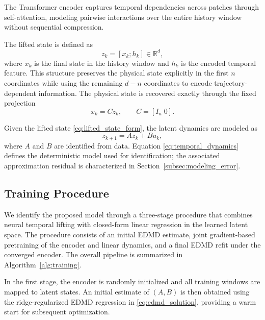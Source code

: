 \documentclass[journal]{IEEEtran}
\begin{document}
The Transformer encoder captures temporal dependencies across patches through self-attention, modeling pairwise interactions over the entire history window without sequential compression.

The lifted state is defined as
\begin{equation}
    z_k = [x_k;h_k] \in \mathbb{R}^{d},
    \label{eq:lifted_state_form}
\end{equation}
where $x_k$ is the final state in the history window and $h_k$ is the encoded temporal feature. This structure preserves the physical state explicitly in the first $n$ coordinates while using the remaining $d-n$ coordinates to encode trajectory-dependent information. The physical state is recovered exactly through the fixed projection
\begin{equation}
    x_k = C z_k, \qquad C = [I_n\;0].
    \label{eq:decoder_projection}
\end{equation}

Given the lifted state \eqref{eq:lifted_state_form}, the latent dynamics are modeled as
\begin{equation}
    z_{k+1} = A z_k + B u_k,
    \label{eq:temporal_dynamics}
\end{equation}
where $A$ and $B$ are identified from data. Equation \eqref{eq:temporal_dynamics} defines the deterministic model used for identification; the associated approximation residual is characterized in Section~\ref{subsec:modeling_error}.

\subsection{Training Procedure}
\label{sec:training}

We identify the proposed model through a three-stage procedure that combines neural temporal lifting with closed-form linear regression in the learned latent space. The procedure consists of an initial EDMD estimate, joint gradient-based pretraining of the encoder and linear dynamics, and a final EDMD refit under the converged encoder. The overall pipeline is summarized in Algorithm~\ref{alg:training}.

In the first stage, the encoder is randomly initialized and all training windows are mapped to latent states. An initial estimate of $(A,B)$ is then obtained using the ridge-regularized EDMD regression in \eqref{eq:edmd_solution}, providing a warm start for subsequent optimization.
\end{document}
